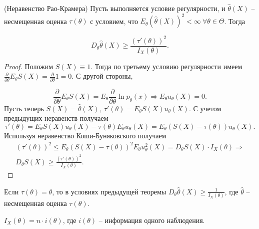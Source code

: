 \begin{theorem}
(Неравенство Рао-Крамера) Пусть выполняется условие регулярности, и $\displaystyle \hat{\theta }( X)$ -- несмещенная оценка $\displaystyle \tau ( \theta )$ с условием, что $\displaystyle E_{\theta }(\hat{\theta }( X))^{2} < \infty \ \forall \theta \in \Theta $. Тогда


\begin{equation*}
D_{\theta }\hat{\theta }( X) \geqslant \frac{( \tau '( \theta ))^{2}}{I_{X}( \theta )} .
\end{equation*}
\end{theorem}
\begin{proof}
Положим $\displaystyle S( X) \equiv 1$. Тогда по третьему условию регулярности имеем $\displaystyle \frac{\partial }{\partial \theta } E_{\theta } S( X) =\frac{\partial }{\partial \theta } 1=0$. С другой стороны,


\begin{equation*}
\frac{\partial }{\partial \theta } E_{\theta } S( X) =E_{\theta }\frac{\partial }{\partial \theta }\ln p_{\theta }( x) \Rightarrow E_{\theta } u_{\theta }( X) =0.
\end{equation*}
Пусть теперь $\displaystyle S( X) =\hat{\theta }( X),\ \tau '( \theta ) =E_{\theta } S( X) u_{\theta }( X)$. С учетом предыдущих неравенств получаем
\begin{equation*}
\tau '( \theta ) =E_{\theta } S( X) u_{\theta }( X) -\tau ( \theta ) E_{\theta } u_{\theta }( X) =E_{\theta }( S( X) -\tau ( \theta )) u_{\theta }( X) .
\end{equation*}
Используя неравенство Коши-Буняковского получаем
\begin{gather*}
( \tau '( \theta ))^{2} \leqslant E_{\theta }( S( X) -\tau ( \theta ))^{2} E_{\theta } u_{\theta }^{2}( X) =D_{\theta } S( X) \cdotp I_{X}( \theta ) \Rightarrow \\
D_{\theta } S( X) \geqslant \frac{( \tau '( \theta ))^{2}}{I_{X}( \theta )} .
\end{gather*}
\end{proof}

\begin{corollary}
Если $\displaystyle \tau ( \theta ) =\theta $, то в условиях предыдущей теоремы $\displaystyle D_{\theta }\hat{\theta }( X) \ge\frac{1}{I_{X}( \theta )}$, где $\displaystyle \hat{\theta }$ -- несмещенная оценка $\displaystyle \tau ( \theta )$.
\end{corollary}

\begin{exercise}
    $\displaystyle I_{X}( \theta ) =n\cdotp i( \theta )$, где $\displaystyle i( \theta )$ -- информация одного наблюдения.
\end{exercise}

